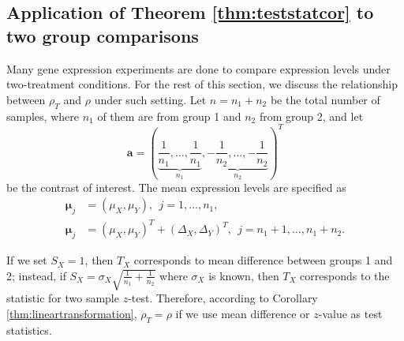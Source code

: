 \documentclass[12pt, a4paper]{article}
\begin{document}
	\subsection{Application of Theorem \ref{thm:teststatcor} to two group comparisons}
	
	Many gene expression experiments are done to compare expression levels under two-treatment conditions. For the rest of this section, we discuss the relationship between $\rho_T$ and $\rho$ under such setting.
	Let $n = n_1 + n_2$ be the total number of samples, where $n_1$ of them are from group 1 and $n_2$ from group 2, and let
	\begin{equation}\label{eq:contrast}
	\bm a  = (\underbrace{\frac{1}{n_1}, \ldots, \frac{1}{n_1}}_{n_1}, \underbrace{-\frac{1}{n_2}, \ldots, -\frac{1}{n_2}}_{n_2})^T
	\end{equation}
	be the contrast of interest. 
	 The mean expression levels are specified as 
	 \begin{equation}\label{eq:meanTwogroup}
	 \begin{aligned}
	 \bm \mu_j &= (\mu_X, \mu_Y),~~ j = 1, \ldots, n_1, \\
	 \bm \mu_j &= (\mu_X,  \mu_Y)^T  + ( \Delta_X,\Delta_Y)^T, ~~j = n_1 + 1, \ldots, n_1 + n_2.
	 \end{aligned}
	 \end{equation}
	 
	 
	If we set $S_X=1$, then $T_X$ corresponds to mean difference between groups 1 and 2; instead, if $S_X = \sigma_X\sqrt{\frac{1}{n_1} + \frac{1}{n_2}}$ where $\sigma_X$ is known, then $T_X$ corresponds to the statistic for two sample $z$-test. Therefore, according to Corollary \ref{thm:lineartransformation},  $\rho_T=\rho$ if we use mean difference or $z$-value as test statistics.
	
\end{document}
